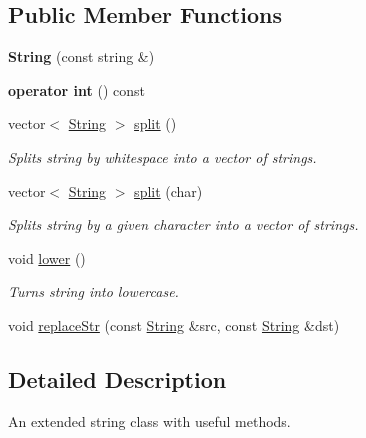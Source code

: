 \subsection*{Public Member Functions}
\begin{DoxyCompactItemize}
\item 
\mbox{\label{classString_a6cca2b7683e5d10ef270d09e42e68e00}} 
{\bfseries String} (const string \&)
\item 
\mbox{\label{classString_a1ef96bc963263871f16188bd68a57112}} 
{\bfseries operator int} () const
\item 
\mbox{\label{classString_ac35fdcdc0f90b151c9c2517f97770f5a}} 
vector$<$ \mbox{\hyperlink{classString}{String}} $>$ \mbox{\hyperlink{classString_ac35fdcdc0f90b151c9c2517f97770f5a}{split}} ()
\begin{DoxyCompactList}\small\item\em Splits string by whitespace into a vector of strings. \end{DoxyCompactList}\item 
\mbox{\label{classString_aa27a2e61292f46af4adce6938d1150ce}} 
vector$<$ \mbox{\hyperlink{classString}{String}} $>$ \mbox{\hyperlink{classString_aa27a2e61292f46af4adce6938d1150ce}{split}} (char)
\begin{DoxyCompactList}\small\item\em Splits string by a given character into a vector of strings. \end{DoxyCompactList}\item 
\mbox{\label{classString_a56e0fc9171e2d63b4c182a30ad0abcd7}} 
void \mbox{\hyperlink{classString_a56e0fc9171e2d63b4c182a30ad0abcd7}{lower}} ()
\begin{DoxyCompactList}\small\item\em Turns string into lowercase. \end{DoxyCompactList}\item 
void \mbox{\hyperlink{classString_aca0926e526b84e04a2141cd6aa694d6f}{replace\+Str}} (const \mbox{\hyperlink{classString}{String}} \&src, const \mbox{\hyperlink{classString}{String}} \&dst)
\end{DoxyCompactItemize}


\subsection{Detailed Description}
An extended string class with useful methods. 


